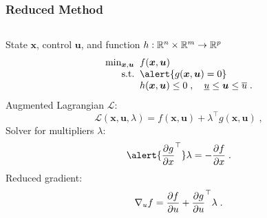 \begin{frame}
\frametitle{Reduced Method}
\begin{columns}
\begin{column}{0.7\linewidth}
  
  State $\bm{x}$, control $\bm{u}$, and function $h: \REAL^{n} \times \REAL^{m} \to \REAL^{p}$
  \begin{equation*}\label{eq:globalproblem}
    \begin{array}{r@{\;\;}l}
      \min_{\bm{x}, \bm{u}} & f(\bm{x}, \bm{u}) \\
      \text{s.t.} & \alert{g(\bm{x}, \bm{u}) = 0 }\\
                  & h(\bm{x}, \bm{u}) \leq 0 \;,
                  \quad \underline{u} \leq \bm{u} \leq \overline{u}  \;.
    \end{array}
  \end{equation*}
  Augmented Lagrangian $\mathcal{L}$:
  \begin{equation*}
    \mathcal{L}(\bm{x}, \bm{u}, \lambda) = f(\bm{x}, \bm{u}) + \lambda^\top g(\bm{x}, \bm{u}) \; ,
  \end{equation*}
  Solver for multipliers $\lambda$:
  \begin{equation*}
    \alert{\dpart{g}{x}^\top} \lambda = -\dpart{f}{x}  \; .
  \end{equation*}
  Reduced gradient:
  \begin{equation*}
    \grad{f}{u} = \dpart{f}{u} + \dpart{g}{u}^\top\lambda \; .
  \end{equation*}
\end{column}
\end{columns}
\end{frame}

